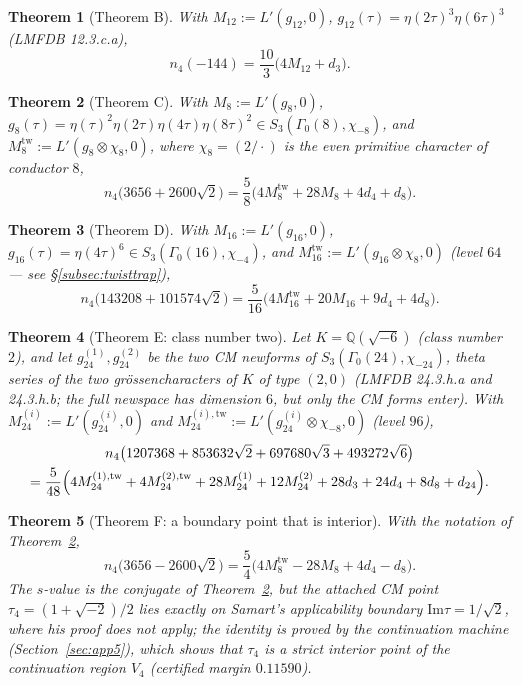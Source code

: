 \documentclass[11pt]{article}
\newcommand{\Qq}{\mathbb{Q}}
\newcommand{\ImT}{\mathrm{Im}}
\newtheorem{theorem}{Theorem}[section]
\theoremstyle{definition}
\theoremstyle{remark}
\begin{document}
\begin{theorem}[Theorem B]\label{thm:B}
With $M_{12}:=L'(g_{12},0)$, $g_{12}(\tau)=\eta(2\tau)^3\eta(6\tau)^3$
\textup{(}LMFDB \textup{\textsf{12.3.c.a}}\textup{)},
\[
  n_4(-144)=\frac{10}{3}\bigl(4M_{12}+d_3\bigr).
\]
\end{theorem}

\begin{theorem}[Theorem C]\label{thm:C}
With $M_8:=L'(g_8,0)$,
$g_8(\tau)=\eta(\tau)^2\eta(2\tau)\eta(4\tau)\eta(8\tau)^2
\in S_3(\Gamma_0(8),\chi_{-8})$,
and $M_8^{\mathrm{tw}}:=L'(g_8\otimes\chi_8,0)$, where
$\chi_8=(2/\cdot)$ is the even primitive character of conductor $8$,
\[
  n_4\bigl(3656+2600\sqrt2\bigr)
  =\frac58\bigl(4M_8^{\mathrm{tw}}+28M_8+4d_4+d_8\bigr).
\]
\end{theorem}

\begin{theorem}[Theorem D]\label{thm:D}
With $M_{16}:=L'(g_{16},0)$,
$g_{16}(\tau)=\eta(4\tau)^6\in S_3(\Gamma_0(16),\chi_{-4})$, and
$M_{16}^{\mathrm{tw}}:=L'(g_{16}\otimes\chi_8,0)$
\textup{(}level $64$ --- see \S\ref{subsec:twisttrap}\textup{)},
\[
  n_4\bigl(143208+101574\sqrt2\bigr)
  =\frac{5}{16}\bigl(4M_{16}^{\mathrm{tw}}+20M_{16}+9d_4+4d_8\bigr).
\]
\end{theorem}

\begin{theorem}[Theorem E: class number two]\label{thm:E}
Let $K=\Qq(\sqrt{-6})$ \textup{(}class number $2$\textup{)}, and let
$g_{24}^{(1)},g_{24}^{(2)}$ be the two CM newforms of
$S_3(\Gamma_0(24),\chi_{-24})$, theta series of the two
gr\"ossencharacters of $K$ of type $(2,0)$ \textup{(}LMFDB
\textup{\textsf{24.3.h.a}} and \textup{\textsf{24.3.h.b}}; the full
newspace has dimension $6$, but only the CM forms
enter\textup{)}.
With $M_{24}^{(i)}:=L'(g_{24}^{(i)},0)$ and
$M_{24}^{(i),\mathrm{tw}}:=L'(g_{24}^{(i)}\otimes\chi_{-8},0)$
\textup{(}level $96$\textup{)},
\begin{multline*}
  n_4\bigl(1207368+853632\sqrt2+697680\sqrt3+493272\sqrt6\bigr)\\
  =\frac{5}{48}\Bigl(4M_{24}^{(1),\mathrm{tw}}
   +4M_{24}^{(2),\mathrm{tw}}+28M_{24}^{(1)}+12M_{24}^{(2)}
   +28d_3+24d_4+8d_8+d_{24}\Bigr).
\end{multline*}
\end{theorem}

\begin{theorem}[Theorem F: a boundary point that is interior]\label{thm:F}
With the notation of Theorem~\ref{thm:C},
\[
  n_4\bigl(3656-2600\sqrt2\bigr)
  =\frac54\bigl(4M_8^{\mathrm{tw}}-28M_8+4d_4-d_8\bigr).
\]
The $s$-value is the conjugate of Theorem~\ref{thm:C}, but the attached
CM point $\tau_4=(1+\sqrt{-2})/2$ lies \emph{exactly} on Samart's
applicability boundary $\ImT\tau=1/\sqrt2$, where his proof does not
apply; the identity is proved by the continuation machine
\textup{(}Section~\ref{sec:app5}\textup{)}, which shows that $\tau_4$
is a strict interior point of the continuation region $V_4$
\textup{(}certified margin $0.11590$\textup{)}.
\end{theorem}
\end{document}
